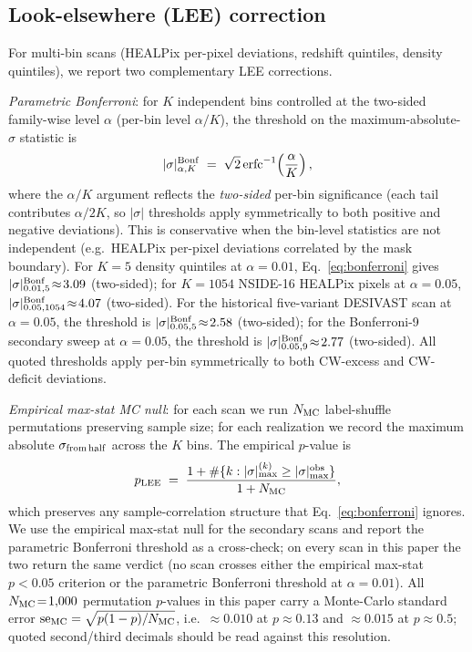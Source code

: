 \documentclass[aps,prd,twocolumn,superscriptaddress,showpacs,preprintnumbers,nofootinbib,longbibliography,floatfix]{revtex4-2}
\begin{document}
\subsection{Look-elsewhere (LEE) correction}\label{sec:lee}

For multi-bin scans (HEALPix per-pixel deviations, redshift quintiles,
density quintiles), we report two complementary LEE corrections.

\emph{Parametric Bonferroni}: for $K$ independent bins controlled at
the two-sided family-wise level $\alpha$ (per-bin level $\alpha/K$),
the threshold on the maximum-absolute-$\sigma$ statistic is
\begin{equation}\label{eq:bonferroni}
|\sigma|^{\rm Bonf}_{\alpha,K} \;=\; \sqrt{2}\,
\mathrm{erfc}^{-1}\!\left(\frac{\alpha}{K}\right),
\end{equation}
where the $\alpha/K$ argument reflects the \emph{two-sided} per-bin
significance (each tail contributes $\alpha/2K$, so $|\sigma|$
thresholds apply symmetrically to both positive and negative
deviations). This is conservative when the bin-level statistics are not
independent (e.g.\ HEALPix per-pixel deviations correlated by the
mask boundary). For $K\!=\!5$ density quintiles at $\alpha\!=\!0.01$,
Eq.~\eqref{eq:bonferroni} gives $|\sigma|^{\rm Bonf}_{0.01,5}\!\approx\!3.09$
(two-sided); for $K\!=\!1054$ NSIDE-16 HEALPix pixels at $\alpha\!=\!0.05$,
$|\sigma|^{\rm Bonf}_{0.05,1054}\!\approx\!4.07$ (two-sided). For the
historical five-variant DESIVAST scan at $\alpha\!=\!0.05$, the threshold is
$|\sigma|^{\rm Bonf}_{0.05,5}\!\approx\!2.58$ (two-sided); for the Bonferroni-9
secondary sweep at $\alpha\!=\!0.05$, the threshold is
$|\sigma|^{\rm Bonf}_{0.05,9}\!\approx\!2.77$ (two-sided). All quoted
thresholds apply per-bin symmetrically to both CW-excess and CW-deficit
deviations.

\emph{Empirical max-stat MC null}: for each scan we run $N_{\rm MC}$
label-shuffle permutations preserving sample size; for each
realization we record the maximum absolute $\sigma_{\rm from\,half}$
across the $K$ bins. The empirical $p$-value is
\begin{equation}\label{eq:empirical_p}
p_{\rm LEE} \;=\; \frac{1 + \#\{k : |\sigma|_{\max}^{(k)} \ge |\sigma|_{\max}^{\rm obs}\}}{1 + N_{\rm MC}},
\end{equation}
which preserves any sample-correlation structure that
Eq.~\eqref{eq:bonferroni} ignores. We use the empirical max-stat
null for the secondary scans and report the parametric Bonferroni threshold as a
cross-check; on every scan in this paper the two return the same
verdict (no scan crosses either the empirical max-stat $p < 0.05$
criterion or the parametric Bonferroni threshold at
$\alpha\!=\!0.01$). All $N_{\rm MC}\!=\!1{,}000$ permutation
$p$-values in this paper carry a Monte-Carlo standard error
${\rm se}_{\rm MC} = \sqrt{p(1-p)/N_{\rm MC}}$, i.e.\
${\approx}0.010$ at $p \approx 0.13$ and ${\approx}0.015$ at
$p \approx 0.5$; quoted second/third decimals should be read against
this resolution.
\end{document}
